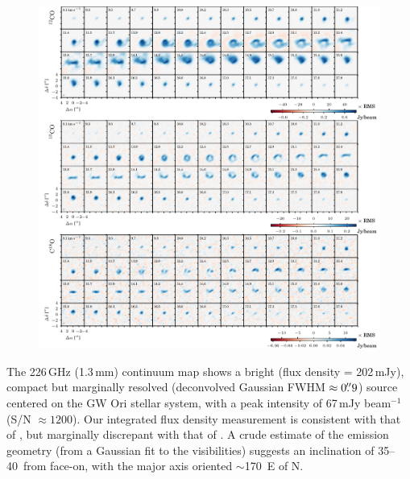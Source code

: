 \documentclass[twocolumn]{aastex61}
\begin{document}
\begin{figure}[ht!]
\begin{center}
  \includegraphics{chmaps_all.pdf}
  \end{center}
\end{figure}

The 226\,GHz (1.3\,mm) continuum map shows a bright (flux density = 202\,mJy), compact but marginally resolved (deconvolved Gaussian FWHM $\approx 0\mbox{$.\!\!^{\prime\prime}$}9$) source centered on the GW Ori stellar system, with a peak intensity of 67\,mJy beam$^{-1}$ (S/N $\approx 1200$). Our integrated flux density measurement is consistent with that of \citet[$255 \pm 60$\,mJy]{mathieu95},  but marginally discrepant with that of \citet[$320 \pm 64$\,mJy]{fang17}. A crude estimate of the emission geometry (from a Gaussian fit to the visibilities) suggests an inclination of 35--40\degr\ from face-on, with the major axis oriented $\sim$170\degr\ E of N.
\end{document}
